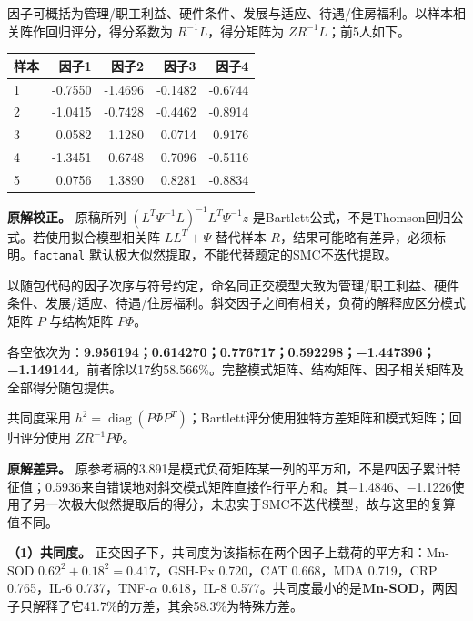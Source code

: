 因子可概括为管理/职工利益、硬件条件、发展与适应、待遇/住房福利。以样本相关阵作回归评分，得分系数为 \(R^{-1}L\)，得分矩阵为 \(Z R^{-1}L\)；前5人如下。

\begin{center}\small\setlength{\tabcolsep}{4pt}\renewcommand{\arraystretch}{1.18}\begin{tabular}{@{}lrrrr@{}}
\toprule
样本 & 因子1 & 因子2 & 因子3 & 因子4 \\
\midrule

1 & -0.7550 & -1.4696 & -0.1482 & -0.6744 \\
2 & -1.0415 & -0.7428 & -0.4462 & -0.8914 \\
3 & 0.0582 & 1.1280 & 0.0714 & 0.9176 \\
4 & -1.3451 & 0.6748 & 0.7096 & -0.5116 \\
5 & 0.0756 & 1.3890 & 0.8281 & -0.8834 \\
\bottomrule\end{tabular}\end{center}

\textbf{原解校正。} 原稿所列 \((L^T\Psi^{-1}L)^{-1}L^T\Psi^{-1}z\) 是Bartlett公式，不是Thomson回归公式。若使用拟合模型相关阵 \(LL^T+\Psi\) 替代样本 \(R\)，结果可能略有差异，必须标明。\texttt{factanal} 默认极大似然提取，不能代替题定的SMC不迭代提取。



以随包代码的因子次序与符号约定，命名同正交模型大致为管理/职工利益、硬件条件、发展/适应、待遇/住房福利。斜交因子之间有相关，负荷的解释应区分模式矩阵 \(P\) 与结构矩阵 \(P\Phi\)。

各空依次为：\textbf{9.956194；0.614270；0.776717；0.592298；−1.447396；−1.149144}。前者除以17约58.566\%。完整模式矩阵、结构矩阵、因子相关矩阵及全部得分随包提供。

共同度采用 \(h^2=\operatorname{diag}(P\Phi P^T)\)；Bartlett评分使用独特方差矩阵和模式矩阵；回归评分使用 \(Z R^{-1}P\Phi\)。

\textbf{原解差异。} 原参考稿的3.891是模式负荷矩阵某一列的平方和，不是四因子累计特征值；0.5936来自错误地对斜交模式矩阵直接作行平方和。其−1.4846、−1.1226使用了另一次极大似然提取后的得分，未忠实于SMC不迭代模型，故与这里的复算值不同。



\textbf{（1）共同度。} 正交因子下，共同度为该指标在两个因子上载荷的平方和：Mn-SOD \(0.62^2+0.18^2=0.417\)，GSH-Px 0.720，CAT 0.668，MDA 0.719，CRP 0.765，IL-6 0.737，TNF-\(\alpha\) 0.618，IL-8 0.577。共同度最小的是\textbf{Mn-SOD}，两因子只解释了它41.7\%的方差，其余58.3\%为特殊方差。

